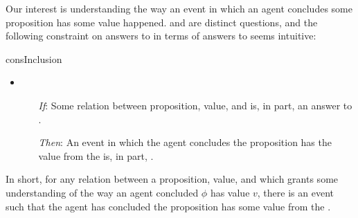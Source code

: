 \begin{note}
  Our interest is understanding the way an event in which an agent concludes some proposition has some value happened.
  \qWhy{} and \qHow{} are distinct questions, and the following constraint on answers to \qWhy{} in terms of answers to \qHow{} seems intuitive:

  \begin{constraint}{consInclusion}{\issueInclusion{}}
    \mbox{ }
    \vspace{-\baselineskip}
    \begin{itemize}
    \item
      \begin{itemize}
      \item[\emph{If}:]
        Some relation between proposition, value, and \pool{} is, in part, an answer to \qWhy{}.
      \item[\emph{Then}:]
      An event in which the agent concludes the proposition has the value from the \pool{} is, in part, \qHow{}.
    \end{itemize}
  \end{itemize}
  \vspace{-\baselineskip}
  \end{constraint}

  In short, for any relation between a proposition, value, and \pool{} which grants some understanding of the way an agent concluded \(\phi\) has value \(v\), there is an event such that the agent has concluded the proposition has some value from the \pool{}.
\end{note}


